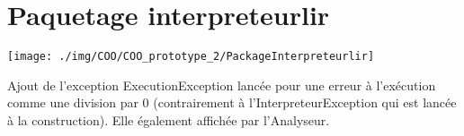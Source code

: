 \section{Paquetage interpreteurlir}
\begin{center}\texttt{[image: ./img/COO/COO\_prototype\_2/PackageInterpreteurlir]}\end{center}
\par Ajout de l'exception ExecutionException lancée pour une erreur à l'exécution comme une division par 0 (contrairement à l'InterpreteurException qui est lancée à la construction). Elle également affichée par l'Analyseur.
